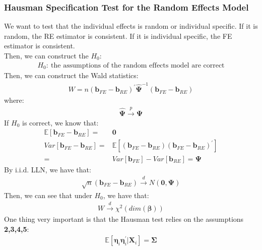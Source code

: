 \documentclass{article}
\begin{document}
\subsubsection{Hausman Specification Test for the Random Effects Model}
We want to test that the individual effects is random or individual specific. If it is random, the RE estimator is consistent. If it is individual specific, the FE estimator is consistent.\\
Then, we can construct the $H_0$:
	\begin{align*}
		H_0:\ \text{the assumptions of the random effects model are correct}
	\end{align*}
Then, we can construct the Wald statistics:
	\begin{align*}
		W = n (\boldsymbol{b}_{FE} - \boldsymbol{b}_{RE})^\prime \hat{\boldsymbol{\Psi}}^{-1} (\boldsymbol{b}_{FE} - \boldsymbol{b}_{RE})
	\end{align*}
where:
	\begin{align*}
		\hat{\boldsymbol{\Psi}} \xrightarrow{p} \boldsymbol{\Psi}
	\end{align*}
If $H_0$ is correct, we know that:
	\begin{align*}
		\mathbb{E} [\boldsymbol{b}_{FE} - \boldsymbol{b}_{RE}] =& \boldsymbol{0}\\
		Var[\boldsymbol{b}_{FE} - \boldsymbol{b}_{RE}] =& \mathbb{E} [(\boldsymbol{b}_{FE} - \boldsymbol{b}_{RE})(\boldsymbol{b}_{FE} - \boldsymbol{b}_{RE})^\prime]\\ = &
		Var[\boldsymbol{b}_{FE}] - Var[\boldsymbol{b}_{RE}] = \boldsymbol{\Psi}
	\end{align*}
By i.i.d. LLN, we have that:
	\begin{align*}
		\sqrt{n} (\boldsymbol{b}_{FE} - \boldsymbol{b}_{RE}) \xrightarrow{d} N(\boldsymbol{0}, \boldsymbol{\Psi})
	\end{align*}
Then, we can see that under $H_0$, we have that:
	\begin{align*}
		W \xrightarrow{d} \chi^2(dim(\boldsymbol{\beta}))
	\end{align*}
One thing very important is that the Hausman test relies on the assumptions \textbf{2,3,4,5}:
	\begin{align*}
		\mathbb{E} [\boldsymbol{\eta}_i \boldsymbol{\eta}^\prime_i | \boldsymbol{X}_i] = \boldsymbol{\Sigma}
	\end{align*}
\end{document}
